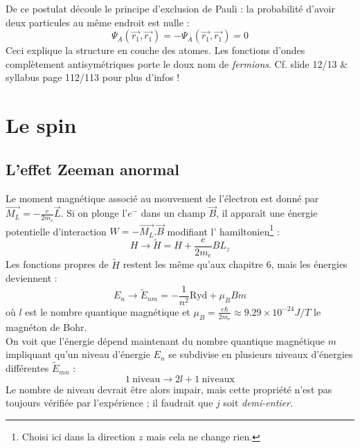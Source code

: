 \documentclass	[11pt, a4paper, openany]{book}
\begin{document}
De ce postulat découle le principe d'exclusion de Pauli : la probabilité d'avoir deux particules au même endroit est nulle :
\begin{equation}
\Psi_A(\vec{r_1},\vec{r_1}) = -\Psi_A(\vec{r_1},\vec{r_1}) = 0
\end{equation}
Ceci explique la structure en couche des atomes. Les fonctions d'ondes complètement antisymétriques porte le doux nom de \textit{fermions}. Cf. slide 12/13 \& syllabus page 112/113 pour plus d'infos !



\chapter{Le spin}
	\section{L'effet Zeeman anormal}
	Le moment magnétique associé au mouvement de l'électron est donné par $\vec{M_L} = 
	-\frac{e}{2m_e}\vec{L}$. Si on plonge l'$e^-$ dans un champ $\vec{B}$, il apparaît
	une énergie potentielle d'interaction $W = -\vec{M_L}.\vec{B}$ modifiant l'
	hamiltonien\footnote{Choisi ici dans la direction $z$ mais cela ne change rien.} :
	\begin{equation}
	H \rightarrow \tilde{H} = H + \frac{e}{2m_e}BL_z
	\end{equation}
	Les fonctions propres de $\tilde{H}$ restent les même qu'aux chapitre 6, mais les 
	énergies deviennent :
	\begin{equation}
	E_n \rightarrow \tilde{E}_{nm} = -\frac{1}{n^2}\text{Ryd} + \mu_BBm
	\end{equation}
	où $l$ est le nombre quantique magnétique et $\mu_B = \frac{e\hbar}{2m_e} \approx
	9.29\times 10^{-24} J/T$ le magnéton de Bohr.\\
	On voit que l'énergie dépend maintenant du nombre quantique magnétique $m$ impliquant
	qu'un niveau d'énergie $E_n$ se subdivise en plusieurs niveaux d'énergies différentes
	$\tilde{E}_{mn}$ :
	\begin{equation}
	1\ \text{niveau} \rightarrow 2l + 1\ \text{niveaux}
	\end{equation}
	Le nombre de niveau devrait être alors impair, mais cette propriété n'est pas toujours
	vérifiée par l'expérience ; il faudrait que $j$ soit \textit{demi-entier.}
	
\end{document}
